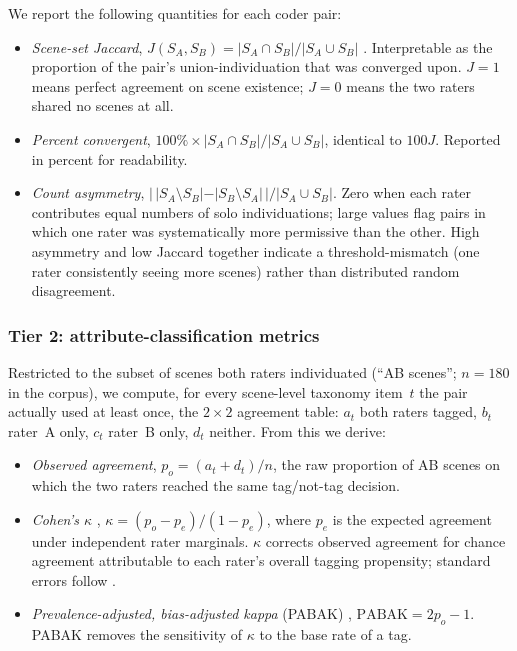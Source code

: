 We report the following quantities for each coder pair:

\begin{itemize}[itemsep=2pt]
\item \emph{Scene-set Jaccard}, $J(S_A,S_B) = |S_A \cap S_B| / |S_A \cup S_B|$ \citep{jaccard1912}. Interpretable as the proportion of the pair's union-individuation that was converged upon. $J=1$ means perfect agreement on scene existence; $J=0$ means the two raters shared no scenes at all.
\item \emph{Percent convergent}, $100\% \times |S_A \cap S_B|/|S_A \cup S_B|$, identical to $100J$. Reported in percent for readability.
\item \emph{Count asymmetry}, $|\,|S_A \setminus S_B| - |S_B \setminus S_A|\,| / |S_A \cup S_B|$. Zero when each rater contributes equal numbers of solo individuations; large values flag pairs in which one rater was systematically more permissive than the other. High asymmetry and low Jaccard together indicate a threshold-mismatch (one rater consistently seeing more scenes) rather than distributed random disagreement.
\end{itemize}

\subsubsection*{Tier 2: attribute-classification metrics}
Restricted to the subset of scenes both raters individuated (``AB scenes''; $n=180$ in the corpus), we compute, for every scene-level taxonomy item~$t$ the pair actually used at least once, the $2\times 2$ agreement table: $a_t$ both raters tagged, $b_t$ rater~A only, $c_t$ rater~B only, $d_t$ neither. From this we derive:

\begin{itemize}[itemsep=2pt]
\item \emph{Observed agreement}, $p_o = (a_t + d_t)/n$, the raw proportion of AB scenes on which the two raters reached the same tag/not-tag decision.
\item \emph{Cohen's $\kappa$} \citep{cohen1960}, $\kappa = (p_o - p_e)/(1 - p_e)$, where $p_e$ is the expected agreement under independent rater marginals. $\kappa$ corrects observed agreement for chance agreement attributable to each rater's overall tagging propensity; standard errors follow \citet{fleiss1969}.
\item \emph{Prevalence-adjusted, bias-adjusted kappa} (PABAK) \citep{byrt1993}, $\mathrm{PABAK} = 2p_o - 1$. PABAK removes the sensitivity of $\kappa$ to the base rate of a tag.
\end{itemize}

